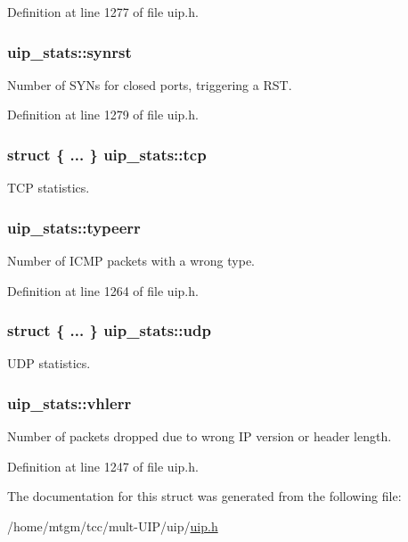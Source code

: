 Definition at line 1277 of file uip.h.

\hypertarget{structuip__stats_ae9205a565ea3c911a785fc4e87c91a58}{
\subsubsection[{synrst}]{ {\bf uip\_\-stats::synrst}}}
\label{structuip__stats_ae9205a565ea3c911a785fc4e87c91a58}
Number of SYNs for closed ports, triggering a RST. 

Definition at line 1279 of file uip.h.

\hypertarget{structuip__stats_a9878d0f8cf7bb6093e18f2d1cdc142c3}{
\subsubsection[{tcp}]{\setlength{\rightskip}{0pt plus 5cm}struct \{ ... \}   {\bf uip\_\-stats::tcp}}}
\label{structuip__stats_a9878d0f8cf7bb6093e18f2d1cdc142c3}
TCP statistics. \hypertarget{structuip__stats_a8da121d6e50992ec55778f9b2141552d}{
\subsubsection[{typeerr}]{ {\bf uip\_\-stats::typeerr}}}
\label{structuip__stats_a8da121d6e50992ec55778f9b2141552d}
Number of ICMP packets with a wrong type. 

Definition at line 1264 of file uip.h.

\hypertarget{structuip__stats_a5e368c2c7dcfeaa1ad1309b480e98d4d}{
\subsubsection[{udp}]{\setlength{\rightskip}{0pt plus 5cm}struct \{ ... \}   {\bf uip\_\-stats::udp}}}
\label{structuip__stats_a5e368c2c7dcfeaa1ad1309b480e98d4d}
UDP statistics. \hypertarget{structuip__stats_ab93e351c3abba0c700b26b7b07e9527d}{
\subsubsection[{vhlerr}]{ {\bf uip\_\-stats::vhlerr}}}
\label{structuip__stats_ab93e351c3abba0c700b26b7b07e9527d}
Number of packets dropped due to wrong IP version or header length. 

Definition at line 1247 of file uip.h.



The documentation for this struct was generated from the following file:\begin{DoxyCompactItemize}
\item 
/home/mtgm/tcc/mult-\/UIP/uip/\hyperlink{uip_8h}{uip.h}\end{DoxyCompactItemize}

